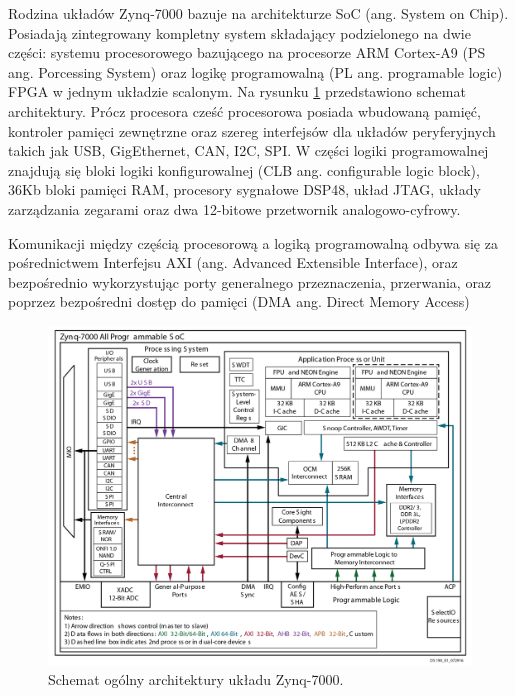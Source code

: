 Rodzina układów Zynq-7000 bazuje na architekturze SoC (ang. System on Chip). Posiadają zintegrowany kompletny system składający podzielonego na dwie części: systemu procesorowego bazującego na procesorze ARM Cortex-A9 (PS ang. Porcessing System) oraz logikę programowalną (PL ang. programable logic) FPGA w jednym układzie scalonym. Na rysunku \ref{fig:zynq7000} przedstawiono schemat architektury. Prócz procesora cześć procesorowa posiada wbudowaną pamięć, kontroler pamięci zewnętrzne oraz szereg interfejsów dla układów peryferyjnych takich jak USB, GigEthernet, CAN, I2C, SPI. W części logiki programowalnej znajdują się bloki logiki konfigurowalnej (CLB ang. configurable logic block), 36Kb bloki pamięci RAM, procesory sygnałowe DSP48, układ JTAG, układy zarządzania zegarami oraz dwa 12-bitowe przetwornik analogowo-cyfrowy.

Komunikacji między częścią procesorową a logiką programowalną odbywa się za pośrednictwem Interfejsu AXI (ang. Advanced Extensible Interface), oraz bezpośrednio wykorzystując porty generalnego przeznaczenia, przerwania, oraz poprzez bezpośredni dostęp do pamięci (DMA ang. Direct Memory Access) 

\begin{figure}[h]
    \centering
    \includegraphics[width=1\textwidth]{images/Zynq-7000-Overview}
    \caption{Schemat ogólny architektury układu Zynq-7000.}
    \label{fig:zynq7000}
\end{figure}

